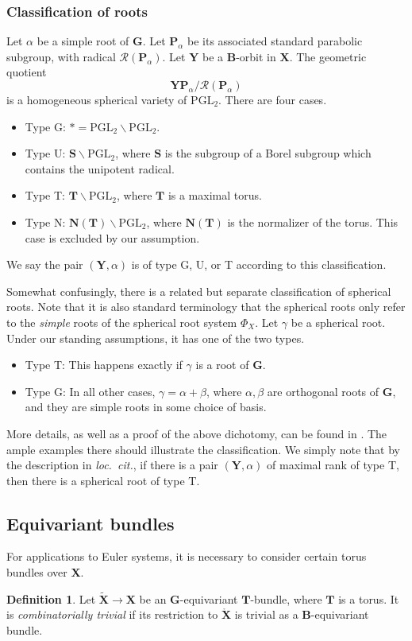 \documentclass{amsart}
\theoremstyle{definition}
\newtheorem{definition}[theorem]{Definition}
\theoremstyle{remark}
\newcommand{\1}{\mathbf{1}}
\newcommand{\mb}[1]{\mathbf{#1}}
\theoremstyle{definition}
\newcommand{\bG}{\mathbf{G}}
\newcommand{\open}[1]{\mathring{#1}}
\begin{document}
\subsubsection{Classification of roots}\label{ss:Classification}
Let $\alpha$ be a simple root of $\mb{G}$. Let $\mb{P}_\alpha$ be its associated standard parabolic subgroup, with radical $\mathcal{R}(\mb{P}_\alpha)$. Let $\mb{Y}$ be a $\mb{B}$-orbit in $\mb{X}$. The geometric quotient
\[
    \mb{Y}\mb{P}_\alpha/\mathcal{R}(\mb{P}_\alpha)
\]
is a homogeneous spherical variety of $\mathrm{PGL}_2$. There are four cases.
\begin{itemize}
    \item Type G: $\ast=\mathrm{PGL}_2\backslash\mathrm{PGL}_2$.
    \item Type U: $\mb{S}\backslash\mathrm{PGL}_2$, where $\mb{S}$ is the subgroup of a Borel subgroup which contains the unipotent radical.
    \item Type T: $\mb{T}\backslash\mathrm{PGL}_2$, where $\mb{T}$ is a maximal torus.
    \item Type N: $\mb{N}(\mb{T})\backslash\mathrm{PGL}_2$, where $\mb{N}(\mb{T})$ is the normalizer of the torus. This case is excluded by our assumption.
\end{itemize}
We say the pair $(\mb{Y},\alpha)$ is of type G, U, or T according to this classification.

Somewhat confusingly, there is a related but separate classification of spherical roots. Note that it is also standard terminology that the spherical roots only refer to the \emph{simple} roots of the spherical root system $\Phi_X$. Let $\gamma$ be a spherical root. Under our standing assumptions, it has one of the two types.
\begin{itemize}
  \item Type T: This happens exactly if $\gamma$ is a root of $\mb{G}$.
  \item Type G: In all other cases, $\gamma=\alpha+\beta$, where $\alpha,\beta$ are orthogonal roots of $\mb{G}$, and they are simple roots in some choice of basis.
\end{itemize}
More details, as well as a proof of the above dichotomy, can be found in \cite[\S 6.2]{SakSpherical}. The ample examples there should illustrate the classification. We simply note that by the description in \emph{loc.~cit.}, if there is a pair $(\mb{Y},\alpha)$ of maximal rank of type T, then there is a spherical root of type T.

\subsection{Equivariant bundles}
For applications to Euler systems, it is necessary to consider certain torus bundles over $\mb{X}$.
\begin{definition}\label{defn:CombTrivial}
  Let $\widetilde{\mb{X}}\to\mb{X}$ be an $\bG$-equivariant $\mb{T}$-bundle, where $\mb{T}$ is a torus. It is \emph{combinatorially trivial} if its restriction to $\open{\mb{X}}$ is trivial as a $\mb{B}$-equivariant bundle.
\end{definition}
\end{document}

